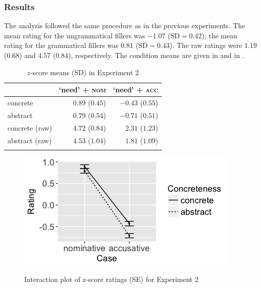\documentclass[output=paper]{langscibook}
\begin{document}
\subsubsection{Results}

The analysis followed the same procedure as in the previous experiments. The mean rating for the ungrammatical fillers was $-1.07$ ($\text{SD} =0.42$); the mean rating for the grammatical fillers was $0.81$ ($\text{SD} =0.43$). The raw ratings were $1.19$ ($0.68$) and $4.57$ ($0.84$), respectively. The condition means are given in  and in . %


\begin{table}
\centering
\begin{tabularx}{0.61\textwidth}{Xrr}
\lsptoprule
   & `need' + \textsc{nom} & `need' + \textsc{acc}\\
\midrule
concrete  &   $0.89$ ($0.45$) &   $-0.43$ ($0.55$)\\
abstract  &   $0.79$ ($0.54$) &   $-0.71$ ($0.51$)\\
concrete (raw)  &   $4.72$ ($0.84$) &   $2.31$ ($1.23$)\\
abstract (raw) &   $4.53$ ($1.04$) &   $1.81$ ($1.09$)\\
\lspbottomrule
\end{tabularx}
\caption{$z$-score means (SD) in Experiment 2}
\label{tab:1:means-exp2}
\end{table}

\begin{figure}
\caption{Interaction plot of z-score ratings (SE) for Experiment 2}
\centering
\includegraphics[scale = 0.5]{figures/exp2_13.png}
\label{fig:exp2}
\end{figure}
\end{document}
